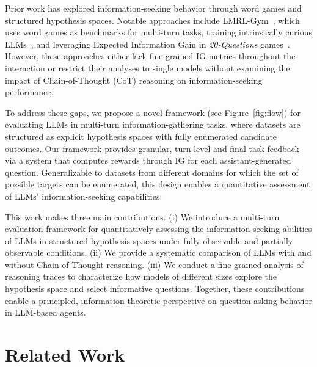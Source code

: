\documentclass[letterpaper]{article} %
\begin{document}
Prior work has explored information-seeking behavior through word games and structured hypothesis spaces. Notable approaches include LMRL-Gym~\cite{abdulhai2023lmrlgymbenchmarksmultiturn}, which uses word games as benchmarks for multi-turn tasks, training intrinsically curious LLMs~\cite{tajwar2025traininggenerallycuriousagent}, and leveraging Expected Information Gain in \emph{20-Questions} games~\cite{mazzaccara2024learningaskinformativequestions, bertolazzi-etal-2023-chatgpts}. However, these approaches either lack fine-grained IG metrics throughout the interaction or restrict their analyses to single models without examining the impact of Chain-of-Thought (CoT) reasoning on information-seeking performance.

To address these gaps, we propose a novel framework (see Figure~\ref{fig:flow}) for evaluating LLMs in multi-turn information-gathering tasks, where datasets are structured as explicit hypothesis spaces with fully enumerated candidate outcomes. Our framework provides granular, turn-level and final task feedback via a system that computes rewards through IG for each assistant-generated question. Generalizable to datasets from different domains for which the set of possible targets can be enumerated, this design enables a quantitative assessment of LLMs' information-seeking capabilities.


This work makes three main contributions. 
(i) We introduce a multi-turn evaluation framework for quantitatively assessing the information-seeking abilities of LLMs in structured hypothesis spaces under fully observable and partially observable conditions. 
(ii) We provide a systematic comparison of LLMs with and without Chain-of-Thought reasoning. 
(iii) We conduct a fine-grained analysis of reasoning traces to characterize how models of different sizes explore the hypothesis space and select informative questions. Together, these contributions enable a principled, information-theoretic perspective on question-asking behavior in LLM-based agents.


\section{Related Work}
\end{document}
